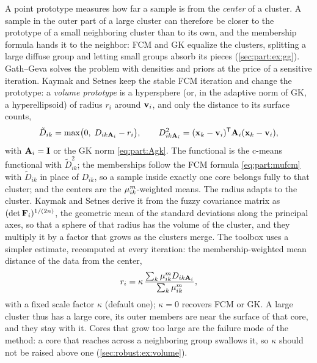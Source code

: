 A point prototype measures how far a sample is from the \emph{center} of a cluster. A sample in the outer part of a large cluster can therefore be closer to the prototype of a small neighboring cluster than to its own, and the membership formula hands it to the neighbor: FCM and GK equalize the clusters, splitting a large diffuse group and letting small groups absorb its pieces (\cref{sec:part:ex:gg}). Gath--Geva solves the problem with densities and priors at the price of a sensitive iteration. Kaymak and Setnes \cite{kaymak:2002:volume} keep the stable FCM iteration and change the prototype: a \emph{volume prototype} is a hypersphere (or, in the adaptive norm of GK, a hyperellipsoid) of radius $r_i$ around $\mathbf{v}_i$, and only the distance to its surface counts,
\begin{equation}
  \tilde D_{ik}=\max\bigl(0,\;D_{ik\mathbf{A}_i}-r_i\bigr),\qquad D^2_{ik\mathbf{A}_i}=(\mathbf{x}_k-\mathbf{v}_i)^{\mathsf{T}}\mathbf{A}_i(\mathbf{x}_k-\mathbf{v}_i),
  \label{eq:robust:volume}
\end{equation}
with $\mathbf{A}_i=\mathbf{I}$ or the GK norm \eqref{eq:part:Agk}. The functional is the c-means functional with $\tilde D^2_{ik}$; the memberships follow the FCM formula \eqref{eq:part:mufcm} with $\tilde D_{ik}$ in place of $D_{ik}$, so a sample inside exactly one core belongs fully to that cluster; and the centers are the $\mu_{ik}^m$-weighted means. The radius adapts to the cluster. Kaymak and Setnes derive it from the fuzzy covariance matrix as $(\det\mathbf{F}_i)^{1/(2n)}$, the geometric mean of the standard deviations along the principal axes, so that a sphere of that radius has the volume of the cluster, and they multiply it by a factor that grows as the clusters merge. The toolbox uses a simpler estimate, recomputed at every iteration: the membership-weighted mean distance of the data from the center,
\begin{equation}
  r_i=\kappa\,\frac{\sum_{k}\mu_{ik}^m D_{ik\mathbf{A}_i}}{\sum_{k}\mu_{ik}^m},
  \label{eq:robust:radius}
\end{equation}
with a fixed scale factor $\kappa$ (default one); $\kappa=0$ recovers FCM or GK. A large cluster thus has a large core, its outer members are near the surface of that core, and they stay with it. Cores that grow too large are the failure mode of the method: a core that reaches across a neighboring group swallows it, so $\kappa$ should not be raised above one (\cref{sec:robust:ex:volume}).

